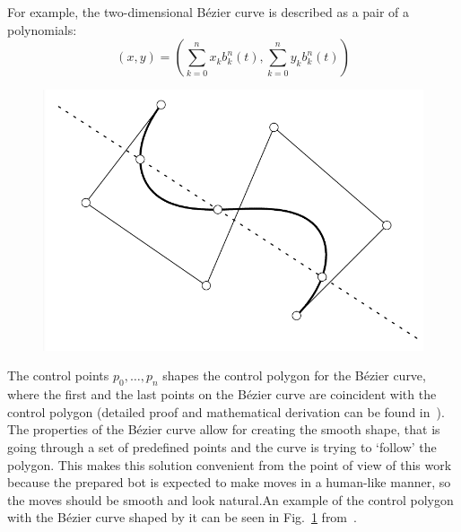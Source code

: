 For example, the two-dimensional Bézier curve is described as a pair of a polynomials:
\begin{equation}
    (x,y) = \left( \sum_{k=0}^n x_{k} b_k^n(t), \sum_{k=0}^n y_{k} b_k^n(t) \right)\label{eq:bezier-point}
\end{equation}

\begin{figure}[h!]
    \centering
    \includegraphics[width=0.4\linewidth,scale=0.4]{resources/bezier-curve-example.png}
    \label{fig:bezier-example}
\end{figure}

The control points $p_0,\dots,p_n$ shapes the control polygon for the Bézier curve, where the first and the last points on the Bézier curve are coincident with the control polygon (detailed proof and mathematical derivation can be found in~\cite{farouki2012bernstein}).
The properties of the Bézier curve allow for creating the smooth shape, that is going through a set of predefined points and the curve is trying to `follow' the polygon.
This makes this solution convenient from the point of view of this work because the prepared bot is expected to make moves in a human-like manner, so the moves should be smooth and look natural.An example of the control polygon with the Bézier curve shaped by it can be seen in Fig.~\ref{fig:bezier-example} from~\cite{farouki2012bernstein}.
